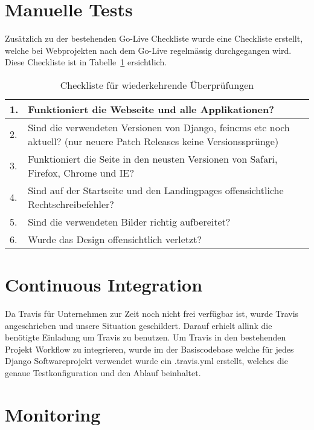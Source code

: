 
\section{Manuelle Tests}
\label{sec:manuelle_tests}
Zusätzlich zu der bestehenden Go-Live Checkliste wurde eine Checkliste erstellt, welche bei Webprojekten nach dem Go-Live regelmässig durchgegangen wird. Diese Checkliste ist in Tabelle~\ref{tab:recuring_checklist} ersichtlich.

\begin{table}[h!]
  \centering
  \begin{tabular}{l p{10cm}}
  \toprule
    1. & Funktioniert die Webseite und alle Applikationen?\\
  \hline
    2. & Sind die verwendeten Versionen von Django, feincms etc noch aktuell? (nur neuere Patch Releases keine Versionssprünge)\\
  \hline
    3. & Funktioniert die Seite in den neusten Versionen von Safari, Firefox, Chrome und IE?\\
  \hline
    4. & Sind auf der Startseite und den Landingpages offensichtliche Rechtschreibefehler?\\
  \hline
    5. & Sind die verwendeten Bilder richtig aufbereitet?\\
  \hline
    6. & Wurde das Design offensichtlich verletzt?\\
  \bottomrule
  \end{tabular}
  \caption{Checkliste für wiederkehrende Überprüfungen}
  \label{tab:recuring_checklist}
\end{table}

\section{Continuous Integration}
\label{sec:continuous_integration_proof_of_concept}
Da Travis für Unternehmen zur Zeit noch nicht frei verfügbar ist, wurde Travis angeschrieben und unsere Situation geschildert. Darauf erhielt allink die benötigte Einladung um Travis zu benutzen.
Um Travis in den bestehenden Projekt Workflow zu integrieren, wurde im der Basiscodebase welche für jedes Django Softwareprojekt verwendet wurde ein .travis.yml erstellt, welches die genaue Testkonfiguration und den Ablauf beinhaltet.

\section{Monitoring}
\label{sec:monitoring_proof_of_concept}

